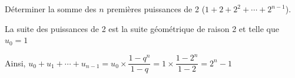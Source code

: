 \documentclass[french]{book}
\newcommand{\R}{\mathbb {R}}
\newcommand{\N}{\mathbb {N}}
\newcommand{\tm}{\times}
\newcommand{\suite}[1][u]{\left( #1_{n} \right)_{n\in\N}}
\begin{document}
\begin{exemple}
Déterminer la somme des $n$ premières puissances de 2 ($1+2+2^2+\cdots+2^{n-1}$).


\par La suite des puissances de 2 est la suite géométrique de raison 2 et telle que $u_0=1$
\par Ainsi, $u_{0}+u_{1}+ \cdots+u_{n-1}=u_{0}\times\dfrac{1-q^{n}}{1-q}=1\times\dfrac{1-2^n}{1-2}=2^n-1$

\end{exemple}

\end{document}
